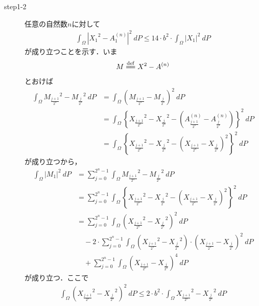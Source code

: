\begin{sketch}
\begin{description}
			\item[step1-2]
				任意の自然数$n$に対して
				\begin{align}
					\int_\Omega \left|{X_{1}}^{2} - A_{1}^{(n)}\right|^{2}\ dP
					\leq 14 \cdot b^{2} \cdot \int_\Omega \left|X_{1}\right|^{2}\ dP
				\end{align}
				が成り立つことを示す．いま
				\begin{align}
					M \defeq X^{2} - A^{(n)}
				\end{align}
				とおけば
				\begin{align}
					\int_\Omega {M_{\frac{j+1}{2^n}}}^{2} - {M_{\frac{j}{2^n}}}^{2}\ dP
					&= \int_\Omega \left(M_{\frac{j+1}{2^n}} - M_{\frac{j}{2^n}} \right)^{2}\ dP \\
					&= \int_\Omega \left\{ {X_{\frac{j+1}{2^n}}}^{2} - {X_{\frac{j}{2^n}}}^{2} -
					\left(A^{(n)}_{\frac{j+1}{2^n}} - A^{(n)}_{\frac{j}{2^n}}\right) \right\}^{2}\ dP \\
					&= \int_\Omega \left\{ {X_{\frac{j+1}{2^n}}}^{2} - {X_{\frac{j}{2^n}}}^{2} -
					\left(X_{\frac{j+1}{2^n}} - X_{\frac{j}{2^n}}\right)^2 \right\}^{2}\ dP
				\end{align}
				が成り立つから，
				\begin{align}
					\int_\Omega \left|M_{1}\right|^{2}\ dP
					&= \sum_{j=0}^{2^n-1} \int_\Omega {M_{\frac{j+1}{2^n}}}^{2} - {M_{\frac{j}{2^n}}}^{2}\ dP \\
					&= \sum_{j=0}^{2^n-1} \int_\Omega \left\{ {X_{\frac{j+1}{2^n}}}^{2} - {X_{\frac{j}{2^n}}}^{2} -
					\left(X_{\frac{j+1}{2^n}} - X_{\frac{j}{2^n}}\right)^2 \right\}^2\ dP \\
					&= \sum_{j=0}^{2^n-1} \int_\Omega \left( {X_{\frac{j+1}{2^n}}}^{2} - {X_{\frac{j}{2^n}}}^{2} \right)^{2}\ dP \\
						&\quad - 2 \cdot \sum_{j=0}^{2^n-1} \int_\Omega \left( {X_{\frac{j+1}{2^n}}}^{2} - {X_{\frac{j}{2^n}}}^{2} \right) \cdot \left(X_{\frac{j+1}{2^n}} - X_{\frac{j}{2^n}}\right)^{2}\ dP \\
						&\quad + \sum_{j=0}^{2^n-1} \int_\Omega \left(X_{\frac{j+1}{2^n}} - X_{\frac{j}{2^n}}\right)^{4}\ dP
					\label{fom:thm_decomposition_of_square_integrable_martingales_1}
				\end{align}
				が成り立つ．ここで
				\begin{align}
					\int_\Omega \left( {X_{\frac{j+1}{2^n}}}^{2} - {X_{\frac{j}{2^n}}}^{2} \right)^{2}\ dP
					\leq 2 \cdot b^{2} \cdot \int_\Omega {X_{\frac{j+1}{2^n}}}^{2} - {X_{\frac{j}{2^n}}}^{2}\ dP
				\end{align}

\end{description}
\end{sketch}
